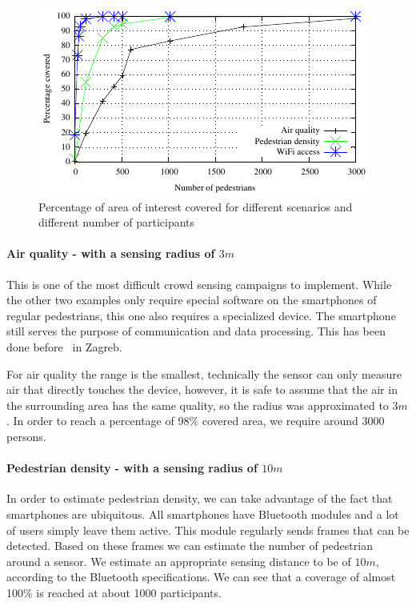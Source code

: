 \begin{figure}
    \centering
    \includegraphics{src/gnuplot/all.pdf}
    \caption{Percentage of area of interest covered for different scenarios and different number of participants}
    \label{fig:all}
\end{figure}

\paragraph{Air quality - with a sensing radius of $3m$} 
This is one of the most difficult crowd sensing campaigns to implement. While the other two examples only require special software on the smartphones of regular pedestrians, this one also requires a specialized device. The smartphone still serves the purpose of communication and data processing. This has been done before~\cite{antonic2014urban} in Zagreb.

For air quality the range is the smallest, technically the sensor can only measure air that directly touches the device, however, it is safe to assume that the air in the surrounding area has the same quality, so the radius was approximated to $3m$. In order to reach a percentage of 98\% covered area, we require around 3000 persons.

\paragraph{Pedestrian density - with a sensing radius of $10m$}
In order to estimate pedestrian density, we can take advantage of the fact that smartphones are ubiquitous. All smartphones have Bluetooth modules and a lot of users simply leave them active. This module regularly sends frames that can be detected. Based on these frames we can estimate the number of pedestrian around a sensor. We estimate an appropriate sensing distance to be of $10m$, according to the Bluetooth specifications. We can see that a coverage of almost 100\% is reached at about 1000 participants.

